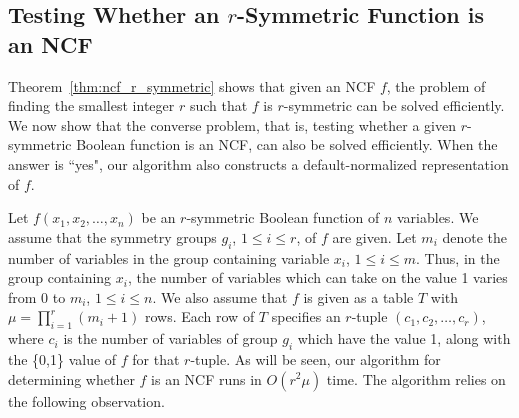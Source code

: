 \subsection{Testing Whether an $r$-Symmetric Function is an NCF}
\label{sse:rsym_to_ncf}

Theorem~\ref{thm:ncf_r_symmetric} shows that given an NCF $f$,
the problem of finding the smallest integer $r$ such that
$f$ is $r$-symmetric can be solved efficiently.
We now show that the converse problem, that is, testing whether a given
$r$-symmetric Boolean function is an NCF,
can also be solved efficiently.
When the answer is ``yes", our algorithm also constructs a
default-normalized representation of $f$.

Let $f(x_1, x_2, \ldots, x_n)$ be an $r$-symmetric Boolean function of $n$
variables.
We assume that the symmetry groups $g_i$, $1 \leq i \leq r$,
of $f$ are given.
Let $m_i$ denote the number of variables
in the group containing variable $x_i$, $1 \leq i \leq m$.
Thus, in the group containing $x_i$, the number
of variables which can take on the value 1 varies from 0
to $m_i$, $1 \leq i \leq n$.
We also assume that $f$ is
given as a table $T$ with $\mu = \prod_{i=1}^r (m_i+1)$ rows.
Each row of $T$ specifies an $r$-tuple $(c_1, c_2, \ldots, c_r)$,
where $c_i$ is the number of variables of group $g_i$ which
have the value 1, along with the \{0,1\} value of $f$ for that $r$-tuple.
As will be seen, our algorithm for determining whether $f$ is
an NCF runs in $O(r^2\mu)$ time.
The algorithm relies on the following observation.

